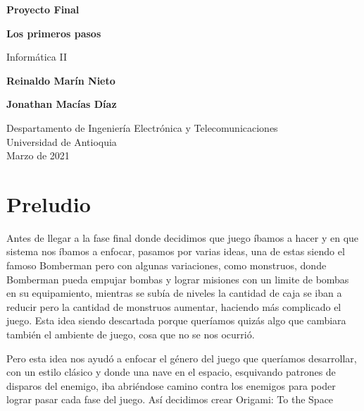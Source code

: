 \documentclass{article}
\begin{document}
\begin{titlepage}
    \begin{center}
        \vspace*{1cm}
            
        \Huge
        \textbf{Proyecto Final}
        
        \textbf{Los primeros pasos}
            
        \vspace{0.5cm}
        \LARGE
        Informática II
            
        \vspace{1.5cm}
            
        \textbf{Reinaldo Marín Nieto}


        \textbf{Jonathan Macías Díaz}
            
        \vfill
            
        \vspace{0.8cm}
            
        \Large
        Despartamento de Ingeniería Electrónica y Telecomunicaciones\\
        Universidad de Antioquia\\
        Marzo de 2021
            
    \end{center}
\end{titlepage}

\tableofcontents
\newpage
\section{Preludio}\label{intro}
Antes de llegar a la fase final donde decidimos que juego íbamos a hacer y en que sistema nos íbamos a enfocar, pasamos por varias ideas, una de estas siendo el famoso Bomberman pero con algunas variaciones, como monstruos, donde Bomberman pueda empujar bombas y lograr misiones con un limite de bombas en su equipamiento, mientras se subía de niveles la cantidad de caja se iban a reducir pero la cantidad de monstruos aumentar, haciendo más complicado el juego. Esta idea siendo descartada porque queríamos quizás algo que cambiara también el ambiente de juego, cosa que no se nos ocurrió.

Pero esta idea nos ayudó a enfocar el género del juego que queríamos desarrollar, con un estilo clásico y donde una nave en el espacio, esquivando patrones de disparos del enemigo, iba abriéndose camino contra los enemigos para poder lograr pasar cada fase del juego. Así decidimos crear Origami: To the Space
\end{document}
